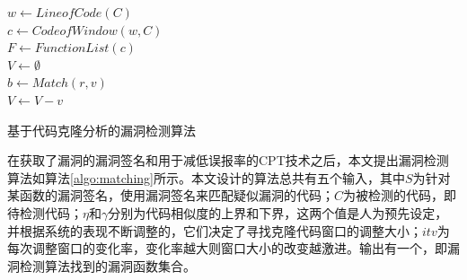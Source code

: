 \begin{algorithm}[htbp]
	\small
    $w \leftarrow LineofCode(C)$ \\
    $c \leftarrow CodeofWindow(w,C)$ \\
    $F \leftarrow FunctionList(c)$ \\
    $V \leftarrow \emptyset$ \\
     {
    }
     {
         {
            $b \leftarrow Match(r, v)$ \\
             {
                $V \leftarrow V - v$ \\
            }
        }
    }
	\caption{基于代码克隆分析的漏洞检测算法}\label{algo:matching}
\end{algorithm}


在获取了漏洞的漏洞签名和用于减低误报率的CPT技术之后，本文提出漏洞检测算法如算法\ref{algo:matching}所示。本文设计的算法总共有五个输入，其中$S$为针对某函数的漏洞签名，使用漏洞签名来匹配疑似漏洞的代码；$C$为被检测的代码，即待检测代码；$\eta$和$\gamma$分别为代码相似度的上界和下界，这两个值是人为预先设定，并根据系统的表现不断调整的，它们决定了寻找克隆代码窗口的调整大小；$itv$为每次调整窗口的变化率，变化率越大则窗口大小的改变越激进。输出有一个，即漏洞检测算法找到的漏洞函数集合。

